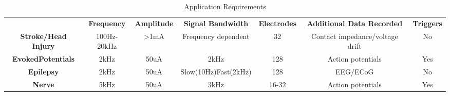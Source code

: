 \begin{table} 
    \begin{tabular}{ c c c c c c c }
         & \textbf{Frequency} & \textbf{Amplitude} & \textbf{Signal Bandwidth} & \textbf{Electrodes} & \textbf{Additional Data Recorded} & \textbf{Triggers} \\ 
        \textbf{Stroke/Head Injury} & 100Hz-20kHz & >1mA & Frequency dependent & 32 & Contact impedance/voltage drift & No \\ 
        \textbf{EvokedPotentials} & 2kHz & 50uA & 2kHz & 128 & Action potentials & Yes \\ 
        \textbf{Epilepsy} & 2kHz & 50uA & Slow(10Hz)Fast(2kHz) & 128 & EEG/ECoG & No \\ 
        \textbf{Nerve} & 5kHz & 50uA & 3kHz & 16-32 & Action potentials & Yes \\ 
    \end{tabular} 
    \caption{Application Requirements} 
\end{table}